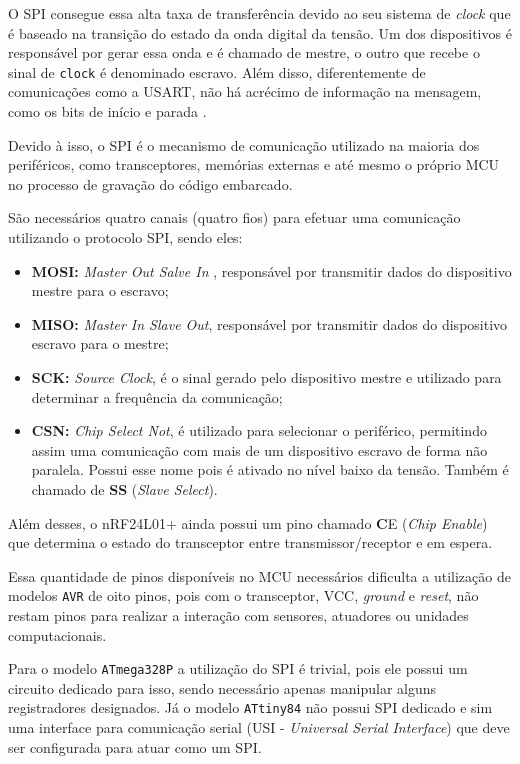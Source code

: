 O SPI consegue essa alta taxa de transferência devido ao seu sistema de \textit{clock} que é baseado na
transição do estado da onda digital da tensão. Um dos dispositivos é responsável por gerar essa onda e é
chamado de mestre, o outro que recebe o sinal de \texttt{clock} é denominado escravo. Além disso,
diferentemente de comunicações como a USART, não há acrécimo de informação na mensagem, como os bits de início
e parada \cite{williams2014}.

Devido à isso, o SPI é o mecanismo de comunicação utilizado na maioria dos periféricos, como transceptores,
memórias externas e até mesmo o próprio MCU no processo de gravação do código embarcado.

São necessários quatro canais (quatro fios) para efetuar uma comunicação utilizando o protocolo SPI, sendo
eles:

\begin{itemize}
	\item \textbf{MOSI:} \textit{Master Out Salve In} , responsável por transmitir dados do dispositivo
		mestre para o escravo;
	\item \textbf{MISO:} \textit{Master In Slave Out}, responsável por transmitir dados do dispositivo
		escravo para o mestre;
	\item \textbf{SCK:} \textit{Source Clock}, é o sinal gerado pelo dispositivo mestre e
		utilizado para determinar a frequência da comunicação;
	\item \textbf{CSN:} \textit{Chip Select Not}, é utilizado para selecionar o periférico, permitindo
		assim uma comunicação com mais de um dispositivo escravo de forma não paralela. Possui esse
		nome pois é ativado no nível baixo da tensão. Também é chamado de \textbf{SS} (\textit{Slave Select}).
\end{itemize}

Além desses, o nRF24L01+ ainda possui um pino chamado \textbf{C}E (\textit{Chip Enable}) que determina o
estado do transceptor entre transmissor/receptor e em espera.

Essa quantidade de pinos disponíveis no MCU necessários dificulta a utilização de modelos \texttt{AVR} de oito
pinos, pois com o transceptor, VCC, \textit{ground} e \textit{reset}, não restam pinos para realizar a
interação com sensores, atuadores ou unidades computacionais.

Para o modelo \texttt{ATmega328P} a utilização do SPI é trivial, pois ele possui um circuito dedicado para
isso, sendo necessário apenas manipular alguns registradores designados. Já o modelo \texttt{ATtiny84} não
possui SPI dedicado e sim uma interface para comunicação serial (USI - \textit{Universal Serial Interface})
que deve ser configurada para atuar como um SPI.

